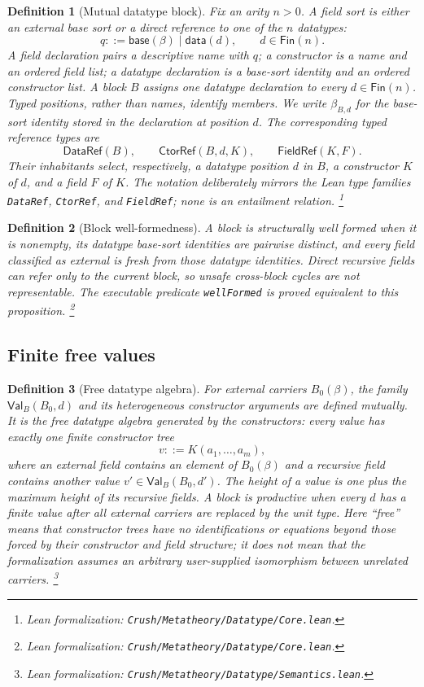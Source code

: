 \documentclass[11pt]{article}
\newtheorem{definition}{Definition}[section]
\theoremstyle{remark}
\newcommand{\leanfile}[1]{\footnote{Lean formalization: \texttt{Crush/Metatheory/#1}.}}
\newcommand{\Val}{\mathsf{Val}}
\newcommand{\dsort}[2]{\beta_{#1,#2}}
\newcommand{\DataRef}[1]{\mathsf{DataRef}(#1)}
\newcommand{\CtorRef}[3]{\mathsf{CtorRef}(#1,#2,#3)}
\newcommand{\FieldRef}[2]{\mathsf{FieldRef}(#1,#2)}
\begin{document}
\begin{definition}[Mutual datatype block]
Fix an arity $n>0$. A field sort is either an external base sort or a direct
reference to one of the $n$ datatypes:
\[
 q ::= \mathsf{base}(\beta)\mid\mathsf{data}(d),
 \qquad d\in\mathsf{Fin}(n).
\]
A field declaration pairs a descriptive name with $q$; a constructor is a
name and an ordered field list; a datatype declaration is a base-sort identity
and an ordered constructor list. A block $B$ assigns one datatype declaration
to every $d\in\mathsf{Fin}(n)$. Typed positions, rather than names, identify
members. We write $\dsort{B}{d}$ for the base-sort identity stored in the
declaration at position $d$. The corresponding typed reference types are
\[
 \DataRef{B},\qquad \CtorRef{B}{d}{K},\qquad \FieldRef{K}{F}.
\]
Their inhabitants select, respectively, a datatype position $d$ in $B$, a
constructor $K$ of $d$, and a field $F$ of $K$. The notation deliberately
mirrors the Lean type families \texttt{DataRef}, \texttt{CtorRef}, and
\texttt{FieldRef}; none is an entailment relation.
\leanfile{Datatype/Core.lean}
\end{definition}

\begin{definition}[Block well-formedness]
A block is structurally well formed when it is nonempty, its datatype
base-sort identities are pairwise distinct, and every field classified as
external is fresh from those datatype identities. Direct recursive fields can
refer only to the current block, so unsafe cross-block cycles are not
representable. The executable predicate \texttt{wellFormed} is proved
equivalent to this proposition.
\leanfile{Datatype/Core.lean}
\end{definition}

\subsection{Finite free values}

\begin{definition}[Free datatype algebra]
For external carriers $B_0(\beta)$, the family
$\Val_B(B_0,d)$ and its heterogeneous constructor arguments are defined
mutually. It is the \emph{free datatype algebra} generated by the constructors:
every value has exactly one finite constructor tree
\[
 v ::= K(a_1,\ldots,a_m),
\]
where an external field contains an element of $B_0(\beta)$ and a recursive
field contains another value $v'\in\Val_B(B_0,d')$. The height of a value is
one plus the maximum height of its recursive fields. A block is
\emph{productive} when every $d$ has a finite value after all external
carriers are replaced by the unit type. Here ``free'' means that constructor
trees have no identifications or equations beyond those forced by their
constructor and field structure; it does not mean that the formalization assumes
an arbitrary user-supplied isomorphism between unrelated carriers.
\leanfile{Datatype/Semantics.lean}
\end{definition}
\end{document}
